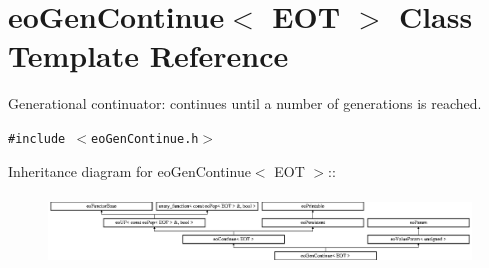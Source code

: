 \section{eo\-Gen\-Continue$<$ EOT $>$ Class Template Reference}
\label{classeo_gen_continue}
Generational continuator: continues until a number of generations is reached.  


{\tt \#include $<$eo\-Gen\-Continue.h$>$}

Inheritance diagram for eo\-Gen\-Continue$<$ EOT $>$::\begin{figure}[H]
\begin{center}
\leavevmode
\includegraphics[height=1.89189cm]{classeo_gen_continue}
\end{center}
\end{figure}
